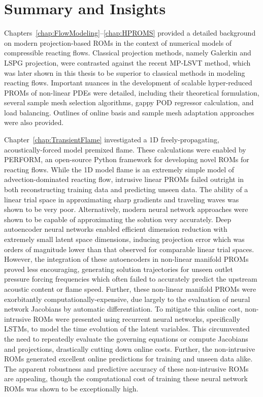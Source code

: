 \section{Summary and Insights}

Chapters~\ref{chap:FlowModeling}--\ref{chap:HPROMS} provided a detailed background on modern projection-based ROMs in the context of numerical models of compressible reacting flows. Classical projection methods, namely Galerkin and LSPG projection, were contrasted against the recent MP-LSVT method, which was later shown in this thesis to be superior to classical methods in modeling reacting flows. Important nuances in the development of scalable hyper-reduced PROMs of non-linear PDEs were detailed, including their theoretical formulation, several sample mesh selection algorithms, gappy POD regressor calculation, and load balancing. Outlines of online basis and sample mesh adaptation approaches were also provided.

Chapter~\ref{chap:TransientFlame} investigated a 1D freely-propagating, acoustically-forced model premixed flame. These calculations were enabled by PERFORM, an open-source Python framework for developing novel ROMs for reacting flows. While the 1D model flame is an extremely simple model of advection-dominated reacting flow, intrusive linear PROMs failed outright in both reconstructing training data and predicting unseen data. The ability of a linear trial space in approximating sharp gradients and traveling waves was shown to be very poor. Alternatively, modern neural network approaches were shown to be capable of approximating the solution very accurately. Deep autoencoder neural networks enabled efficient dimension reduction with extremely small latent space dimensions, inducing projection error which was orders of magnitude lower than that observed for comparable linear trial spaces. However, the integration of these autoencoders in non-linear manifold PROMs proved less encouraging, generating solution trajectories for unseen outlet pressure forcing frequencies which often failed to accurately predict the upstream acoustic content or flame speed. Further, these non-linear manifold PROMs were exorbitantly computationally-expensive, due largely to the evaluation of neural network Jacobians by automatic differentiation. To mitigate this online cost, non-intrusive ROMs were presented using recurrent neural networks, specifically LSTMs, to model the time evolution of the latent variables. This circumvented the need to repeatedly evaluate the governing equations or compute Jacobians and projections, drastically cutting down online costs. Further, the non-intrusive ROMs generated excellent online predictions for training and unseen data alike. The apparent robustness and predictive accuracy of these non-intrusive ROMs are appealing, though the computational cost of training these neural network ROMs was shown to be exceptionally high.


